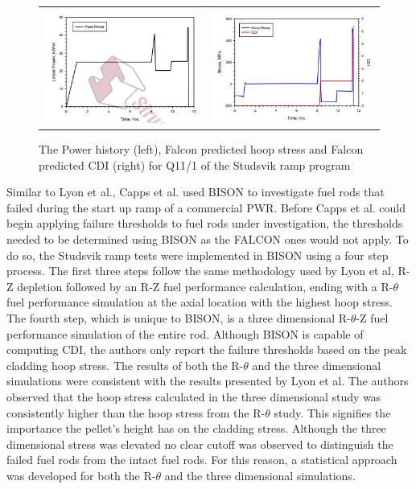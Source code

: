 \documentclass[edeposit,fullpage,12pt]{uiucthesis2009}
\begin{document}
\begin{figure}
\begin{tabular}{cc}
\includegraphics[width=0.5\linewidth]{./Figures/lyon_image_6.JPG} & \includegraphics[width=0.5\linewidth]{./Figures/lyon_image_7.JPG}
\end{tabular}
\caption{The Power history (left), Falcon predicted hoop stress and Falcon predicted CDI (right) for Q11/1 of the Studsvik ramp program \cite{lyon_pci_2009}}
\label{fig:paper_3_res}
\end{figure}


Similar to Lyon et al., Capps et al. \cite{capps_pci_2017} used BISON to investigate fuel rods that failed during the start up ramp of a commercial \gls{PWR}.
Before Capps et al. could begin applying failure thresholds to fuel rods under investigation, the thresholds needed to be determined using BISON as the FALCON ones would not apply.
To do so, the Studsvik ramp tests were implemented in BISON using a four step process.
The first three steps follow the same methodology used by Lyon et al, R-Z depletion followed by an R-Z fuel performance calculation, ending with a R-$\theta$ fuel performance simulation at the axial location with the highest hoop stress.
The fourth step, which is unique to BISON, is a three dimensional R-$\theta$-Z fuel performance simulation of the entire rod.
Although BISON is capable of computing \gls{CDI}, the authors only report the failure thresholds based on the peak cladding hoop stress.
The results of both the R-$\theta$ and the three dimensional simulations were consistent with the results presented by Lyon et al.
The authors observed that the hoop stress calculated in the three dimensional study was consistently higher than the hoop stress from the R-$\theta$ study.
This signifies the importance the pellet's height has on the cladding stress.
Although the three dimensional stress was elevated no clear cutoff was observed to distinguish the failed fuel rods from the intact fuel rods.
For this reason, a statistical approach was developed for both the R-$\theta$ and the three dimensional simulations.
\end{document}
